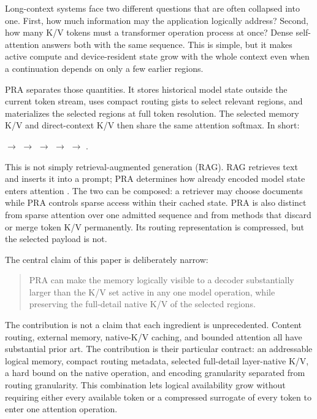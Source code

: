 \documentclass[11pt]{article}
\begin{document}
Long-context systems face two different questions that are often collapsed into one.
First, how much information may the application logically address? Second, how many K/V
tokens must a transformer operation process at once? Dense self-attention answers both
with the same sequence. This is simple, but it makes active compute and device-resident
state grow with the whole context even when a continuation depends on only a few earlier
regions.

PRA separates those quantities. It stores historical model state outside the current
token stream, uses compact routing gists to select relevant regions, and materializes the
selected regions at full token resolution. The selected memory K/V and direct-context
K/V then share the same attention softmax. In short:

\begin{center}
$\rightarrow$ 
$\rightarrow$ 
$\rightarrow$ 
$\rightarrow$ 
$\rightarrow$ .
\end{center}

This is not simply retrieval-augmented generation (RAG). RAG retrieves text and inserts
it into a prompt; PRA determines how already encoded model state enters attention
\cite{lewis2020rag,guu2020realm,borgeaud2022retro}. The two can be composed: a retriever
may choose documents while PRA controls sparse access within their cached state. PRA is
also distinct from sparse attention over one admitted sequence and from methods that
discard or merge token K/V permanently. Its routing representation is compressed, but
the selected payload is not.

The central claim of this paper is deliberately narrow:

\begin{quote}
PRA can make the memory logically visible to a decoder substantially larger than the K/V
set active in any one model operation, while preserving the full-detail native K/V of the
selected regions.
\end{quote}

The contribution is not a claim that each ingredient is unprecedented. Content routing,
external memory, native-K/V caching, and bounded attention all have substantial prior art. The
contribution is their particular contract: an addressable logical memory, compact
routing metadata, selected full-detail layer-native K/V, a hard bound on the native operation,
and encoding granularity separated from routing granularity. This combination lets logical
availability grow without requiring either every available token or a compressed surrogate of
every token to enter one attention operation.
\end{document}
